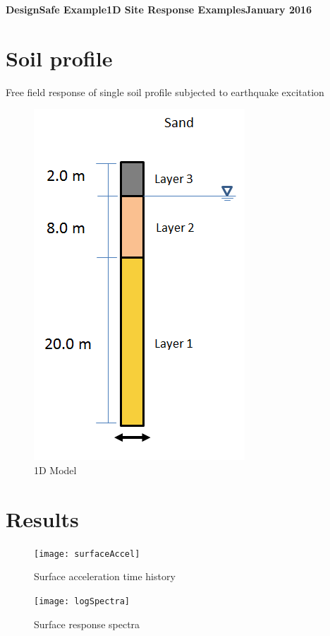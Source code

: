 \documentclass[11pt,fleqn]{article}
\begin{document}
	\begin{center}
	
		\textbf{{DesignSafe Example\hfill{}1D Site Response Examples\hfill{}January 2016}}

	\end{center}
   

\section{Soil profile}

Free field response of single soil profile subjected to earthquake excitation

\begin{figure}[h!]
\centering
\includegraphics[scale=0.7]{schematic}
\caption{1D Model}
\end{figure}

\newpage
\section{Results}

\begin{figure}[h!]
\centering
\texttt{[image: surfaceAccel]}
\caption{Surface acceleration time history}
\end{figure}

\begin{figure}[h!]
\centering
\texttt{[image: logSpectra]}
\caption{Surface response spectra}
\end{figure}
\end{document}
